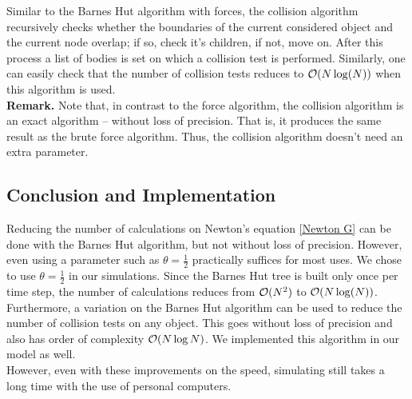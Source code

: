 Similar to the Barnes Hut algorithm with forces, the collision algorithm recursively checks whether the boundaries of the current considered object and the current node overlap; if so, check it's children, if not, move on. After this process a list of bodies is set on which a collision test is performed. Similarly, one can easily check that the number of collision tests reduces to $\mathcal{O}(N\log(N))$ when this algorithm is used.\\
\textbf{Remark.} Note that, in contrast to the force algorithm, the collision algorithm is an exact algorithm -- without loss of precision. That is, it produces the same result as the brute force algorithm. Thus, the collision algorithm doesn't need an extra parameter.
\subsection{Conclusion and Implementation}
Reducing the number of calculations on Newton's equation \ref{Newton G} can be done with the Barnes Hut algorithm, but not without loss of precision. However, even using a parameter such as $\theta=\frac{1}{2}$ practically suffices for most uses. We chose to use $\theta = \frac{1}{2}$ in our simulations. Since the Barnes Hut tree is built only once per time step, the number of calculations reduces from $\mathcal{O}(N^2)$ to $\mathcal{O}(N\log(N))$.\\
Furthermore, a variation on the Barnes Hut algorithm can be used to reduce the number of collision tests on any object. This goes without loss of precision and also has order of complexity $\mathcal{O}(N\log N)$. We implemented this algorithm in our model as well.\\
However, even with these improvements on the speed, simulating still takes a long time with the use of personal computers.

